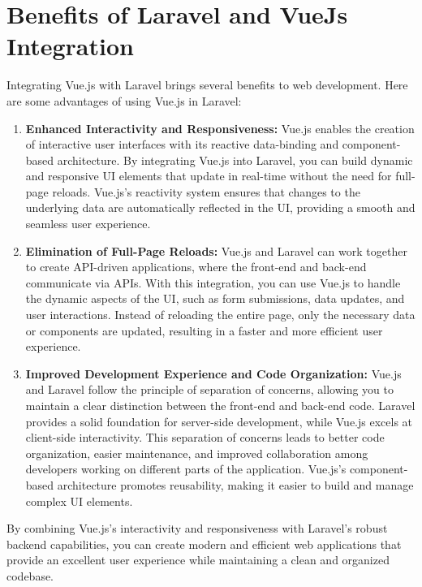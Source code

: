 \section{Benefits of Laravel and VueJs Integration}
Integrating Vue.js with Laravel brings several benefits to web development. Here are some advantages of using Vue.js in Laravel:
\begin{enumerate}
    \item \textbf{Enhanced Interactivity and Responsiveness:}
        Vue.js enables the creation of interactive user interfaces with its reactive data-binding and component-based architecture.
        By integrating Vue.js into Laravel, you can build dynamic and responsive UI elements that update in real-time without the need for full-page reloads.
        Vue.js's reactivity system ensures that changes to the underlying data are automatically reflected in the UI, providing a smooth and seamless user experience.

        \item \textbf{Elimination of Full-Page Reloads:}
        Vue.js and Laravel can work together to create API-driven applications, where the front-end and back-end communicate via APIs.
        With this integration, you can use Vue.js to handle the dynamic aspects of the UI, such as form submissions, data updates, and user interactions.
        Instead of reloading the entire page, only the necessary data or components are updated, resulting in a faster and more efficient user experience.

        \item \textbf{Improved Development Experience and Code Organization:}
        Vue.js and Laravel follow the principle of separation of concerns, allowing you to maintain a clear distinction between the front-end and back-end code.
        Laravel provides a solid foundation for server-side development, while Vue.js excels at client-side interactivity.
        This separation of concerns leads to better code organization, easier maintenance, and improved collaboration among developers working on different parts of the application.
        Vue.js's component-based architecture promotes reusability, making it easier to build and manage complex UI elements.
    \end{enumerate}
By combining Vue.js's interactivity and responsiveness with Laravel's robust backend capabilities, you can create modern and efficient web applications that provide an excellent user experience while maintaining a clean and organized codebase.
\newpage
